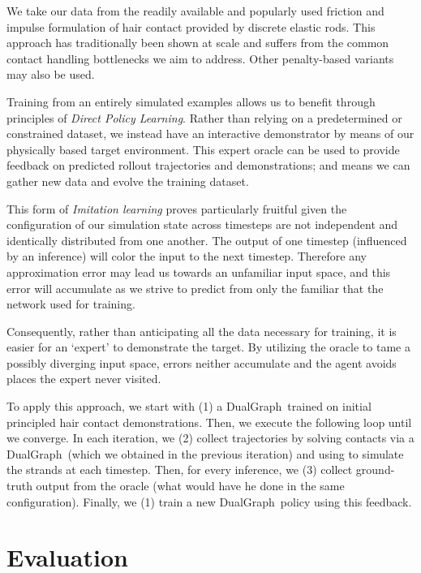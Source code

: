 \documentclass[12pt]{report}
\newcommand{\hn}{DualGraph}
\begin{document}
We take our data from the readily available and popularly used 
friction and impulse formulation of hair contact provided by discrete elastic rods.
This approach has traditionally been shown at scale
\cite{adonis14,gilles20} and suffers from 
the common contact handling bottlenecks we aim to address.
Other penalty-based variants \cite{Fei2017wetHair,li2020codimensional} may also
be used.

Training from an entirely simulated examples allows us to benefit
through principles of \emph{Direct Policy Learning}.
Rather than relying on a predetermined or constrained dataset, we instead
have an interactive demonstrator by means of our physically based target environment.
This expert oracle can be used to provide feedback on predicted 
rollout trajectories and demonstrations; 
and means we can gather new data and evolve the training dataset.

This form of \emph{Imitation learning} proves particularly fruitful given
the configuration of our simulation state across timesteps are not
independent and identically distributed from one another.
The output of one timestep (influenced by an inference) will color the input
to the next timestep.
Therefore any approximation error may lead us towards
an unfamiliar input space, and this error will accumulate as we strive to predict
from only the familiar that the network used for training.

Consequently, rather than anticipating all the data necessary for training,
it is easier for an ‘expert’ to demonstrate the target.
By utilizing the oracle to tame a possibly diverging input space,
errors neither accumulate and the agent avoids places the expert never visited.

To apply this approach, we start with 
(1) a \hn~trained on initial principled hair contact demonstrations. 
Then, we execute the following loop until we converge. 
In each iteration, we (2) collect trajectories by solving contacts 
via a \hn~(which we obtained in the previous iteration) 
and using to simulate the strands at each timestep. 
Then, for every inference, 
we (3) collect ground-truth output from the oracle 
(what would have he done in the same configuration). 
Finally, we (1) train a new \hn~policy using this feedback.

\vspace{-3mm}
\section{Evaluation}
\end{document}
